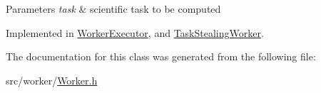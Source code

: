 \begin{DoxyParams}{Parameters}
{\em task} & scientific task to be computed \\
\hline
\end{DoxyParams}


Implemented in \hyperlink{class_worker_executor_a7edee52a5d96dea5da7dc0e0ba461b45}{Worker\+Executor}, and \hyperlink{class_task_stealing_worker_aa3dd8530803573c2029dcf2c32d4d5ae}{Task\+Stealing\+Worker}.



The documentation for this class was generated from the following file\+:\begin{DoxyCompactItemize}
\item 
src/worker/\hyperlink{_worker_8h}{Worker.\+h}\end{DoxyCompactItemize}
